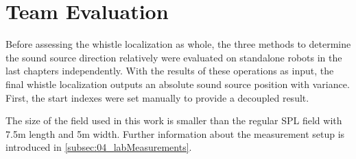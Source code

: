 \section{Team Evaluation}
\label{sec:04_teamEvaluation}

Before assessing the whistle localization as whole, the three methods
to determine the sound source direction relatively
were evaluated on standalone robots in the last chapters independently.
With the results of these operations as input,
the final whistle localization outputs an absolute sound source position
with variance.
First, the start indexes were set manually to provide a decoupled result.

The size of the field used in this work is smaller than the regular \ac{SPL}
field with 7.5\si{m} length and 5\si{m} width.
Further information about the measurement setup is introduced in \cref{subsec:04_labMeasurements}.

